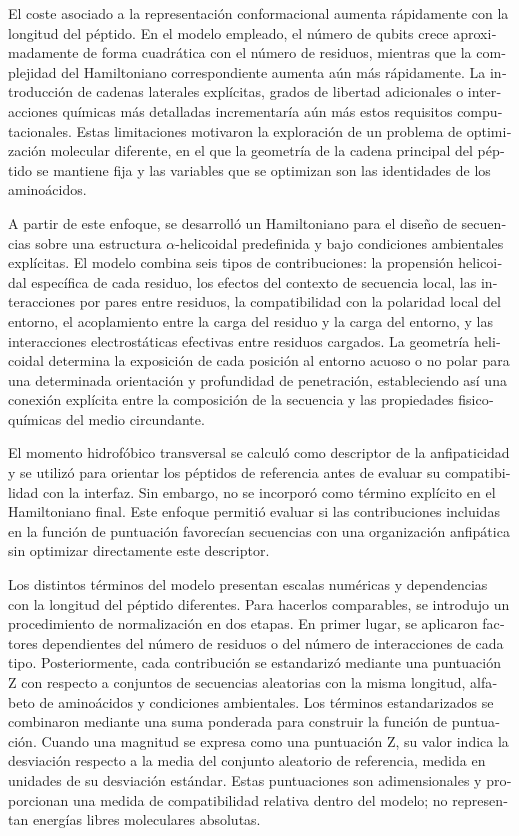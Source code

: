\begin{otherlanguage}{spanish}
El coste asociado a la representación conformacional aumenta rápidamente con la longitud del péptido. En el modelo empleado, el número de qubits crece aproximadamente de forma cuadrática con el número de residuos, mientras que la complejidad del Hamiltoniano correspondiente aumenta aún más rápidamente. La introducción de cadenas laterales explícitas, grados de libertad adicionales o interacciones químicas más detalladas incrementaría aún más estos requisitos computacionales. Estas limitaciones motivaron la exploración de un problema de optimización molecular diferente, en el que la geometría de la cadena principal del péptido se mantiene fija y las variables que se optimizan son las identidades de los aminoácidos.

A partir de este enfoque, se desarrolló un Hamiltoniano para el diseño de secuencias sobre una estructura $\alpha$-helicoidal predefinida y bajo condiciones ambientales explícitas. El modelo combina seis tipos de contribuciones: la propensión helicoidal específica de cada residuo, los efectos del contexto de secuencia local, las interacciones por pares entre residuos, la compatibilidad con la polaridad local del entorno, el acoplamiento entre la carga del residuo y la carga del entorno, y las interacciones electrostáticas efectivas entre residuos cargados. La geometría helicoidal determina la exposición de cada posición al entorno acuoso o no polar para una determinada orientación y profundidad de penetración, estableciendo así una conexión explícita entre la composición de la secuencia y las propiedades fisicoquímicas del medio circundante.

El momento hidrofóbico transversal se calculó como descriptor de la anfipaticidad y se utilizó para orientar los péptidos de referencia antes de evaluar su compatibilidad con la interfaz. Sin embargo, no se incorporó como término explícito en el Hamiltoniano final. Este enfoque permitió evaluar si las contribuciones incluidas en la función de puntuación favorecían secuencias con una organización anfipática sin optimizar directamente este descriptor.

Los distintos términos del modelo presentan escalas numéricas y dependencias con la longitud del péptido diferentes. Para hacerlos comparables, se introdujo un procedimiento de normalización en dos etapas. En primer lugar, se aplicaron factores dependientes del número de residuos o del número de interacciones de cada tipo. Posteriormente, cada contribución se estandarizó mediante una puntuación Z con respecto a conjuntos de secuencias aleatorias con la misma longitud, alfabeto de aminoácidos y condiciones ambientales. Los términos estandarizados se combinaron mediante una suma ponderada para construir la función de puntuación. Cuando una magnitud se expresa como una puntuación Z, su valor indica la desviación respecto a la media del conjunto aleatorio de referencia, medida en unidades de su desviación estándar. Estas puntuaciones son adimensionales y proporcionan una medida de compatibilidad relativa dentro del modelo; no representan energías libres moleculares absolutas.


\end{otherlanguage}
